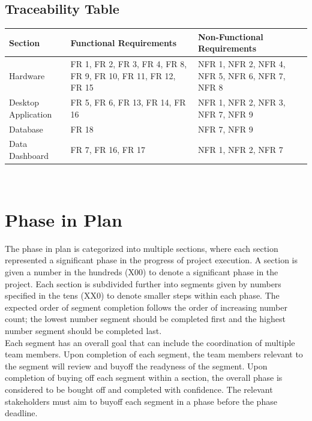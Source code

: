 \documentclass[12pt,titlepage]{article}
\begin{document}
\subsection{Traceability Table}

  \begin{tabular}{| p{} | p{}| p{}|}
    \hline
    \rowcolor[gray]{0.9}
    Section & Functional Requirements & Non-Functional Requirements\\
    \hline
    Hardware & FR 1, FR 2, FR 3, FR 4, FR 8, FR 9, FR 10, FR 11, FR 12, FR 15 & NFR 1, NFR 2, NFR 4, NFR  5, NFR 6, NFR 7, NFR 8 \\
    \hline
    Desktop Application & FR 5, FR 6, FR 13, FR 14, FR 16 & NFR 1, NFR 2, NFR 3, NFR 7, NFR 9\\
    \hline
    Database & FR 18 & NFR 7, NFR 9\\
    \hline
    Data Dashboard & FR 7, FR 16, FR 17 & NFR 1, NFR 2, NFR 7\\
    \hline
  \end{tabular}
\\


\section{Phase in Plan}

The phase in plan is categorized into multiple sections, where each section represented a significant phase in the progress of project execution. A section is given a number in the hundreds (X00) to denote a significant phase in the project. Each section is subdivided further into segments given by numbers specified in the tens (XX0) to denote smaller steps within each phase. The expected order of segment completion follows the order of increasing number count; the lowest number segment should be completed first and the highest number segment should be completed last.\\

Each segment has an overall goal that can include the coordination of multiple team members. Upon completion of each segment, the team members relevant to the segment will review and buyoff the readyness of the segment. Upon completion of buying off each segment within a section, the overall phase is considered to be bought off and completed with confidence. The relevant stakeholders must aim to buyoff each segment in a phase before the phase deadline.\\
\end{document}
